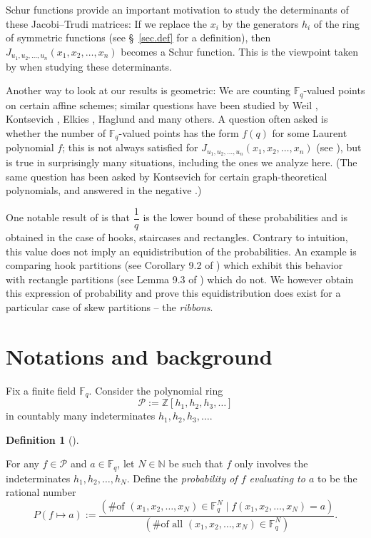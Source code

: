 \documentclass[numbers=enddot,12pt,final,onecolumn,notitlepage]{scrartcl}%
\theoremstyle{definition}
\newtheorem{defi}[theo]{Definition}
\newenvironment{definition}[1][]
{\begin{defi}[#1]\begin{leftbar}}
{\end{leftbar}\end{defi}}
\newcommand{\tup}[1]{\left( #1 \right)}
\newcommand{\Fq}{\mathbb{F}_q}
\theoremstyle{plainsl}
\begin{document}
Schur functions provide an important motivation to study the determinants of these Jacobi--Trudi matrices:
If we replace the $x_{i}$ by the generators $h_{i}$ of the
ring of symmetric functions (see \S~\ref{sec.def} for a definition), then
$J_{u_1, u_2, \ldots, u_n}\tup{x_1, x_2, \ldots, x_n}$ becomes a Schur
function.
This is the viewpoint taken by \cite{Anzis18} when studying these determinants. 

Another way to look at our results is geometric: We are counting $\Fq$-valued points on certain affine schemes;
similar questions have been studied by Weil \cite{Weil}, Kontsevich \cite{Kontsevich, Stembridge, RPStan, Belkale2003}, Elkies \cite{Elkies}, Haglund \cite{Haglund} and many others.
A question often asked is whether the number of $\Fq$-valued points has the form $f\tup{q}$ for some Laurent polynomial $f$; this is not always satisfied for $J_{u_1, u_2, \ldots, u_n}\tup{x_1, x_2, \ldots, x_n}$ (see \cite[Proposition 5.7]{Anzis18}), but is true in surprisingly many situations, including the ones we analyze here. (The same question has been asked by Kontsevich for certain graph-theoretical polynomials, and answered in the negative \cite{Belkale2003}.)

One notable result of \cite{Anzis18} is that $\dfrac{1}{q}$ is the lower bound of these probabilities and is obtained in the case of hooks, staircases and rectangles. Contrary to intuition, this value does not imply an equidistribution of the probabilities. An example is comparing hook partitions (see Corollary 9.2 of \cite{Anzis18}) which exhibit this behavior with rectangle partitions (see Lemma 9.3 of \cite{Anzis18}) which do not. We however obtain this expression of probability and prove this equidistribution does exist for a particular case of skew partitions -- the \emph{ribbons}.

\section{\label{sec.def}Notations and background}

Fix a finite field $\mathbb{F}_{q}$. Consider the polynomial ring 
\[
\mathcal{P} := \mathbb{Z}\left[  h_{1},h_{2},h_{3},\ldots\right]
\]
in countably many indeterminates $h_{1},h_{2},h_{3},\ldots$.

\begin{definition}
\label{def.mapstozero}
For any $f\in\mathcal{P}$ and $a\in\mathbb{F}_{q}$,
let $N\in\mathbb{N}$ be such that $f$ only
involves the indeterminates $h_{1},h_{2},\ldots,h_{N}$.
Define the \emph{probability of $f$ evaluating to $a$}
to be the rational number
\[
P\left(  f\mapsto a\right)  :=\dfrac{\left(  \text{\# of }\left(  x_{1}%
,x_{2},\ldots,x_{N}\right)  \in\mathbb{F}_{q}^{N} \mid f\left(
x_{1},x_{2},\ldots,x_{N}\right)  =a\right)  }{\left(  \text{\# of all }\left(
x_{1},x_{2},\ldots,x_{N}\right)  \in\mathbb{F}_{q}^{N}\right)  }.
\]
\end{definition}
\end{document}
